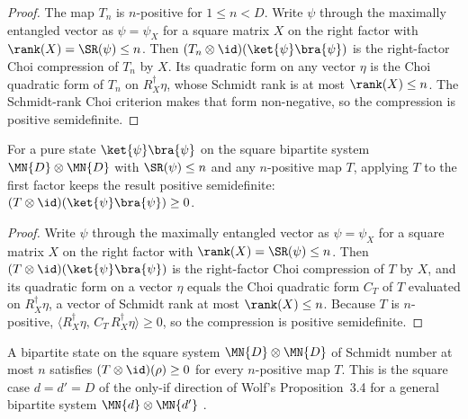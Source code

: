 \begin{proof}
    \leanok
    The map $T_n$ is $n$-positive for $1\le n<D$. Write $\psi$ through the maximally
    entangled vector as $\psi=\psi_X$ for a square matrix $X$ on the right factor with
    $\rank(X)=\SR(\psi)\le n$. Then
    $(T_n\otimes\id)(\ket{\psi}\bra{\psi})$ is the right-factor Choi compression of
    $T_n$ by $X$. Its quadratic form on any vector $\eta$ is the Choi quadratic form
    of $T_n$ on $R_X^\dagger\eta$, whose Schmidt rank is at most
    $\rank(X)\le n$. The Schmidt-rank Choi criterion makes that form
    non-negative, so the compression is positive semidefinite.
\end{proof}

\begin{theorem}
    \label{thm:tensor_map_id_posSemidef_pure}
    \leanok
    For a pure state $\ket{\psi}\bra{\psi}$ on the square bipartite system
    $\MN{D}\otimes\MN{D}$ with $\SR(\psi)\le n$ and any $n$-positive map
    $T$, applying $T$ to the first factor keeps the result positive semidefinite:
    $(T\otimes\id)(\ket{\psi}\bra{\psi})\ge 0$.
\end{theorem}

\begin{proof}
    \leanok
    Write $\psi$ through the maximally entangled vector as $\psi=\psi_X$ for a square
    matrix $X$ on the right factor with
    $\rank(X)=\SR(\psi)\le n$. Then
    $(T\otimes\id)(\ket{\psi}\bra{\psi})$ is the right-factor Choi compression of $T$
    by $X$, and its quadratic form on a vector $\eta$ equals the Choi quadratic form
    $C_T$ of $T$ evaluated on $R_X^\dagger\eta$, a vector of Schmidt rank at most
    $\rank(X)\le n$. Because $T$ is $n$-positive,
    $\langle R_X^\dagger\eta,\, C_T\, R_X^\dagger\eta\rangle\ge 0$, so the
    compression is positive semidefinite.
\end{proof}

\begin{theorem}
    \label{thm:has_schmidt_number_le_tensor_map_id}
    \leanok
    A bipartite state on the square system $\MN{D}\otimes\MN{D}$ of Schmidt number at
    most $n$ satisfies $(T\otimes\id)(\rho)\ge 0$ for every $n$-positive map $T$.
    This is the square case $d=d'=D$ of the only-if direction of Wolf's
    Proposition~3.4 for a general bipartite system
    $\MN{d}\otimes\MN{d'}$ \cite[Chapter~3, Proposition~3.4]{Wolf2012Quantum}.
\end{theorem}

